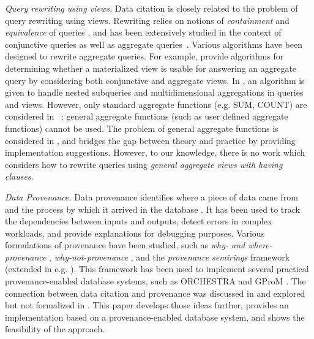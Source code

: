 {\em Query rewriting using views.} %
Data citation is closely related to the problem of query rewriting using views.
Rewriting relies on notions of {\em containment} and {\em equivalence} of queries \cite{halevy2001answering}, and has been extensively studied 
in the context of conjunctive queries \cite{chandra1977optimal, chaudhuri1995optimizing, pottinger2000scalable, afrati2007using} as well as aggregate queries~\cite{cohen2007deciding, cohen1999rewriting}. 
Various algorithms have been designed to rewrite aggregate queries.
For example, \cite{srivastava1996answering, galindo2001orthogonal} provide algorithms for determining whether a materialized view is usable for answering an aggregate query by considering both conjunctive and aggregate views.
In \cite{zaharioudakis2000answering}, an algorithm is given to handle nested subqueries and multidimensional aggregations in queries and views. However, only standard aggregate functions (e.g. SUM, COUNT) are considered in ~\cite{zaharioudakis2000answering, srivastava1996answering, galindo2001orthogonal}; general aggregate functions (such as
user defined aggregate functions) cannot be used. The problem of general aggregate functions is considered in \cite{cohen2006rewriting}, and \cite{cohen2006user} bridges the gap between theory and practice by providing  implementation suggestions. However, to our knowledge, there is no work which considers how to rewrite queries using \textit{general aggregate views with having clauses}.

{\em Data Provenance.} Data provenance identifies where a piece of data came from and the process by which it arrived in the database \cite{buneman2001and}.  It has been used to track the dependencies between inputs and outputs, detect errors in complex workloads, and provide explanations for debugging purposes. Various formulations of provenance have been studied, such as \textit{why- and where-provenance} \cite{buneman2001and}, \textit{why-not-provenance} \cite{chapman2009not}, and the \textit{provenance semirings} framework \cite{green2007provenance} (extended in e.g. \cite{amsterdamer2011provenance,xu2018provenance}). This framework has been used to implement several practical provenance-enabled database systems, such as ORCHESTRA \cite{ives2008orchestra} and GProM \cite{arab2018gprom}. The connection between data citation and provenance was discussed in \cite{BunemanEtAl2016} and explored but not formalized in \cite{alawini2018data}. This paper develops those ideas further, provides an implementation based on a provenance-enabled database system, and shows the feasibility of the approach.

